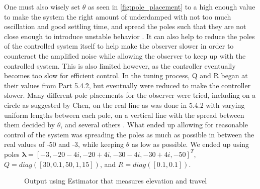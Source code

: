 One must also wisely set $\theta$ as seen in \cref{fig:pole_placement}
to a high enough value to make the system the right amount of
underdamped with not too much oscillation and good settling time, and
spread the poles such that they are not close enough to introduce
unstable behavior \cite[p.290]{chen14}. It can also help to reduce the
poles of the controlled system itself to help make the observer slower
in order to counteract the amplified noise while allowing the observer
to keep up with the controlled system. This is also limited however,
as the controller eventually becomes too slow for efficient control.
In the tuning process, Q and R began at their values from Part 5.4.2,
but eventually were reduced to make the controller slower. Many
different pole placements for the observer were tried, including on a
circle as suggested by Chen, on the real line as was done in 5.4.2
with varying uniform lengths between each pole, on a vertical line
with the spread between them decided by $\theta$, and several others
\cite[p.290]{chen14}.
What ended up allowing for reasonable control of the system was
spreading the poles as much as possible in between the real values of
-50 and -3, while keeping $\theta$ as low as possible.  We ended up
using poles $\bm{\lambda} = [-3, -20-4i, -20+4i, -30-4i, -30+4i,
-50]^T$, $Q = diag([30, 0.1, 50, 1, 15])$, and $R = diag([0.1,
0.1])$.

\begin{figure}[h]
  \caption{Output using Estimator that measures elevation and travel}
  \label{fig:Estimator4_3}
\end{figure}
\restoregeometry
